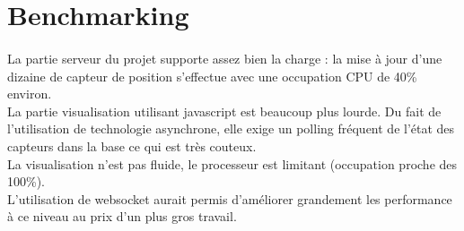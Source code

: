 \section{Benchmarking}
\paragraph{} La partie serveur du projet supporte assez bien la charge : la mise à jour d'une dizaine de capteur de position s'effectue avec une occupation CPU de 40\% environ.\\
La partie visualisation utilisant javascript est beaucoup plus lourde. Du fait de l'utilisation de technologie asynchrone, elle exige un polling fréquent de l'état des capteurs dans la base ce qui est très couteux.\\ 
La visualisation n'est pas fluide, le processeur est limitant (occupation proche des 100\%).\\

L'utilisation de websocket aurait permis d'améliorer grandement les performance à ce niveau au prix d'un plus gros travail.